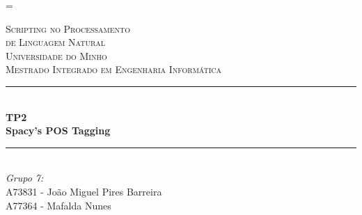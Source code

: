 \documentclass[12pt]{article}
\begin{document}
\sloppy
\LTcapwidth=\textwidth

\begin{titlepage}

\newcommand{\HRule}{\rule{\linewidth}{0.5mm}} %

\center %

\vspace{0.5cm}
 

\textsc{\LARGE Scripting no Processamento}\\[0.3cm]
\textsc{\LARGE de Linguagem Natural}\\[1.1cm] %
\textsc{\Large Universidade do Minho}\\[0.5cm] %
\textsc{\large Mestrado Integrado em Engenharia Informática}\\[0.5cm] %

\vspace{0.8cm}
\HRule \\[0.6cm]
{ \huge \bfseries TP2}\\[0.4cm] %
{ \Large \bfseries Spacy's POS Tagging}\\[0.4cm] %
\HRule \\[1.0cm]
 

\Large \emph{Grupo 7:}\\
A73831 - João Miguel Pires Barreira\\
A77364 - Mafalda Nunes\\[1.3cm]



\end{titlepage}
\end{document}
